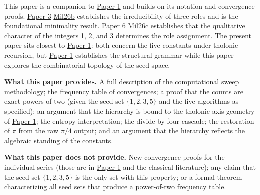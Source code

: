 \documentclass[
  11pt,
  letterpaper,
]{article}
\begin{document}
This paper is a companion to
\href{https://github.com/baardev/truevalue/blob/main/docnav/Research/papers/1_recursive-tholonic-five-constants/1_recursive-tholonic-five-constants.pdf}{Paper
1} and builds on its notation and convergence proofs.
\href{https://github.com/baardev/truevalue/blob/main/docnav/Research/papers/3_minimal-recursive-triadic-framework/3_minimal-recursive-triadic-framework.pdf}{Paper
3}
\href{https://github.com/baardev/truevalue/blob/main/docnav/Research/papers/3_minimal-recursive-triadic-framework/3_minimal-recursive-triadic-framework.pdf}{Mil26b}
establishes the irreducibility of three roles and is the foundational
minimality result.
\href{https://github.com/baardev/truevalue/blob/main/docnav/Research/papers/6_qualitative-nature-integers-triadic-roles/6_qualitative-nature-integers-triadic-roles.pdf}{Paper
6}
\href{https://github.com/baardev/truevalue/blob/main/docnav/Research/papers/6_qualitative-nature-integers-triadic-roles/6_qualitative-nature-integers-triadic-roles.pdf}{Mil26c}
establishes that the qualitative character of the integers 1, 2, and 3
determines the role assignment. The present paper sits closest to
\href{https://github.com/baardev/truevalue/blob/main/docnav/Research/papers/1_recursive-tholonic-five-constants/1_recursive-tholonic-five-constants.pdf}{Paper
1}: both concern the five constants under tholonic recursion, but
\href{https://github.com/baardev/truevalue/blob/main/docnav/Research/papers/1_recursive-tholonic-five-constants/1_recursive-tholonic-five-constants.pdf}{Paper
1} establishes the structural grammar while this paper explores the
combinatorial topology of the seed space.

\textbf{What this paper provides.} A full description of the
computational sweep methodology; the frequency table of convergences; a
proof that the counts are exact powers of two (given the seed set
\(\{1, 2, 3, 5\}\) and the five algorithms as specified); an argument
that the hierarchy is bound to the tholonic axis geometry of
\href{https://github.com/baardev/truevalue/blob/main/docnav/Research/papers/1_recursive-tholonic-five-constants/1_recursive-tholonic-five-constants.pdf}{Paper
1}; the entropy interpretation; the divide-by-four cascade; the
restoration of \(\pi\) from the raw \(\pi/4\) output; and an argument
that the hierarchy reflects the algebraic standing of the constants.

\textbf{What this paper does not provide.} New convergence proofs for
the individual series (those are in
\href{https://github.com/baardev/truevalue/blob/main/docnav/Research/papers/1_recursive-tholonic-five-constants/1_recursive-tholonic-five-constants.pdf}{Paper
1} and the classical literature); any claim that the seed set
\(\{1, 2, 3, 5\}\) is the only set with this property; or a formal
theorem characterizing all seed sets that produce a power-of-two
frequency table.
\end{document}
